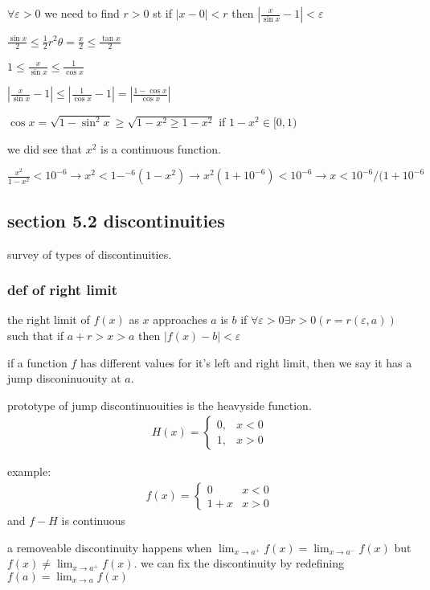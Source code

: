 \documentclass[letterpaper]{article}
\begin{document}
$\forall\varepsilon>0$ we need to find $r>0$ st if $|x-0|<r$ then $|\frac{x}{\sin x}-1|<\varepsilon$

$\frac{\sin x}{2}\le \frac{1}{2}r^2\theta=\frac{x}{2}\le \frac{\tan x}{2}$

$1\le \frac{x}{\sin x}\le \frac{1}{\cos x}$

$|\frac{x}{\sin x}-1|\le |\frac{1}{\cos x}-1|=\left\lvert\frac{1-\cos x}{\cos x}\right\rvert$

$\cos x=\sqrt{1-\sin^2 x}\ge \sqrt{1-x^2\ge 1-x^2}$ if $1-x^2\in [0,1)$

we did see that $x^2$ is a continuous function.

$\frac{x^2}{1-x^2}<10^{-6}\to x^2<1-^{-6}(1-x^2)\to x^2(1+10^{-6})<10^{-6}\to x<10^{-6}/(1+10^{-6}$

\subsection*{section 5.2 discontinuities}
survey of types of discontinuities.

\subsubsection*{def of right limit}
the right limit of $f(x)$ as $x$ approaches $a$ is $b$ if $\forall \varepsilon>0\exists r>0 (r=r(\varepsilon,a))$ such that if $a+r>x>a$ then $|f(x)-b|<\varepsilon$

if a function $f$ has different values for it's left and right limit, then we say it has a jump disconinuouity at $a$.

prototype of jump discontinuouities is the heavyside function.
\begin{align*}
  H(x)=
  \begin{cases}
    0,&x<0\\
    1,&x>0
  \end{cases}
\end{align*}

example:
\begin{align*}
  f(x)=
  \begin{cases}
    0&x<0\\
    1+x&x>0
  \end{cases}
\end{align*}
and $f-H$ is continuous

a removeable discontinuity happens when $\lim_{x\to a^+}f(x)=\lim_{x\to a^-}f(x)$ but $f(x)\ne \lim_{x\to a^+}f(x)$. we can fix the discontinuity by redefining $f(a)=\lim_{x\to a}f(x)$
\end{document}
